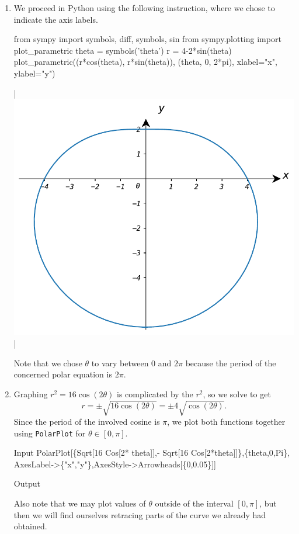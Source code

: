 \begin{example}
\begin{enumerate}
\ifpython
\item We proceed in Python using the following instruction, where we chose to indicate the axis labels.
\begin{pyin}
from sympy import symbols, diff, symbols, sin
from sympy.plotting import plot_parametric
theta = symbols('theta')
r = 4-2*sin(theta)
plot_parametric((r*cos(theta), r*sin(theta)), (theta, 0, 2*pi), xlabel="x", ylabel="y")
\end{pyin}
\begin{pyout}
|\includegraphics{figures/Parametric/fig_parametric_5_Python.pdf}|
\end{pyout}
\fi

Note that we chose $\theta$ to vary between 0 and $2\pi$ because the period of the concerned polar equation is $2\pi$. 
\item  Graphing $r^2 = 16 \cos(2\theta)$ is complicated by the $r^2$, so we solve to get $$r = \pm \sqrt{16 \cos(2\theta)} = \pm 4 \sqrt{\cos(2\theta)}.$$
Since the period of the involved cosine is $\pi$, we plot both functions together using \lstinline{PolarPlot} for $\theta\in[0,\pi]$.

\begin{mdframed}[default,backgroundcolor=gray!40,roundcorner=8pt]
\begin{mmaCell}[morefunctionlocal={theta},moredefined={PolarPlot,Arrowheads}]{Input}
  PolarPlot[\{Sqrt[16 Cos[2* theta]],- Sqrt[16 Cos[2*theta]]\},\{theta,0,Pi\},
	 AxesLabel->\{"x","y"\},AxesStyle->Arrowheads[\{0,0.05\}]]
\end{mmaCell}



\begin{mmaCell}[moregraphics={moreig={scale=.4}}]{Output}
\end{mmaCell}
\end{mdframed}
Also note that we may plot values of  $\theta$ outside of the interval $[0,\pi]$, but then we will  find ourselves retracing parts of the curve we already had obtained. 
\end{enumerate}

\end{example}

